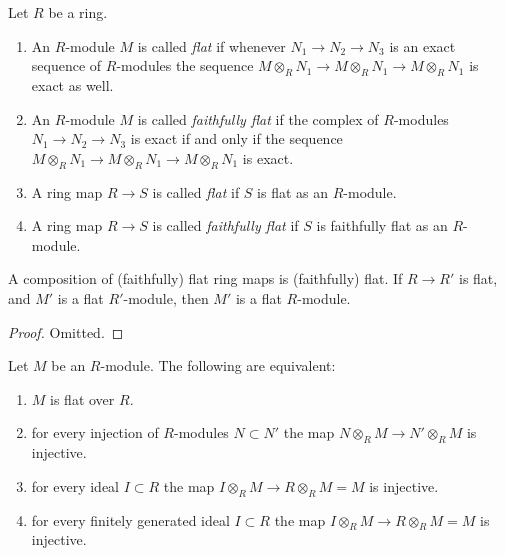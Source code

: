 \begin{definition}
\label{definition-flat}
Let $R$ be a ring.
\begin{enumerate}
\item An $R$-module $M$ is called {\it flat} if whenever
$N_1 \to N_2 \to N_3$ is an exact sequence of $R$-modules
the sequence $M\otimes_R N_1 \to M\otimes_R N_1\to M\otimes_R N_1$
is exact as well.
\item An $R$-module $M$ is called {\it faithfully flat} if the
complex of $R$-modules
$N_1 \to N_2 \to N_3$ is exact if and only if
the sequence $M\otimes_R N_1\to M\otimes_R N_1\to M\otimes_R N_1$
is exact.
\item A ring map $R \to S$ is called {\it flat} if
$S$ is flat as an $R$-module.
\item A ring map $R \to S$ is called {\it faithfully flat} if
$S$ is faithfully flat as an $R$-module.
\end{enumerate}
\end{definition}

\begin{lemma}
\label{lemma-composition-flat}
A composition of (faithfully) flat ring maps is
(faithfully) flat. If $R \to R'$ is flat, and $M'$ is a flat
$R'$-module, then $M'$ is a flat $R$-module.
\end{lemma}

\begin{proof}
Omitted.
\end{proof}

\begin{lemma}
\label{lemma-flat}
Let $M$ be an $R$-module. The following are equivalent:
\begin{enumerate}
\item $M$ is flat over $R$.
\label{item-flat}
\item for every injection of $R$-modules $N \subset N'$
the map $N\otimes_R M \to N'\otimes_R M$ is injective.
\label{item-injective}
\item for every ideal $I \subset R$ the map
$I\otimes_R M \to R\otimes_R M = M$ is injective.
\label{item-f-ideal}
\item for every finitely generated ideal $I \subset R$
the map $I\otimes_R M \to R\otimes_R M = M$ is injective.
\label{item-ffg-ideal}
\end{enumerate}
\end{lemma}

